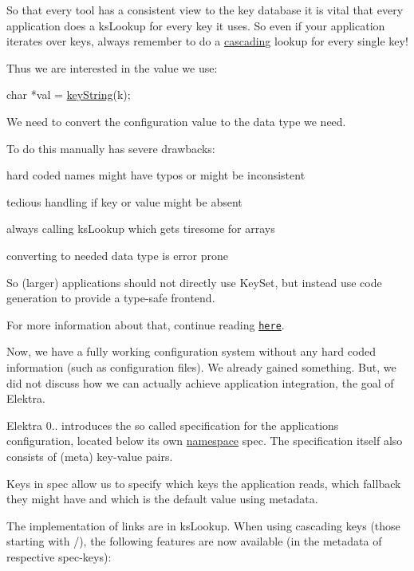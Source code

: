 So that every tool has a consistent view to the key database it is vital that every application does a {\ttfamily ks\+Lookup} for every key it uses. So even if your application iterates over keys, always remember to do a \hyperlink{doc_tutorials_cascading_md}{cascading} lookup for every single key!

Thus we are interested in the value we use\+:


\begin{DoxyCode}
\textcolor{keywordtype}{char} *val = \hyperlink{group__keyvalue_ga880936f2481d28e6e2acbe7486a21d05}{keyString}(k);
\end{DoxyCode}


We need to convert the configuration value to the data type we need.

To do this manually has severe drawbacks\+:


\begin{DoxyItemize}
\item hard coded names might have typos or might be inconsistent
\item tedious handling if key or value might be absent
\item always calling {\ttfamily ks\+Lookup} which gets tiresome for arrays
\item converting to needed data type is error prone
\end{DoxyItemize}

So (larger) applications should not directly use {\ttfamily Key\+Set}, but instead use code generation to provide a type-\/safe frontend.

For more information about that, continue reading \href{https://master.libelektra.org/src/tools/pythongen}{\tt here}.

Now, we have a fully working configuration system without any hard coded information (such as configuration files). We already gained something. But, we did not discuss how we can actually achieve application integration, the goal of Elektra.

Elektra 0.. introduces the so called specification for the application\textquotesingle{}s configuration, located below its own \hyperlink{doc_help_elektra-namespaces_md}{namespace} {\ttfamily spec}. The specification itself also consists of (meta) key-\/value pairs.

Keys in {\ttfamily spec} allow us to specify which keys the application reads, which fallback they might have and which is the default value using metadata.

The implementation of links are in {\ttfamily ks\+Lookup}. When using cascading keys (those starting with {\ttfamily /}), the following features are now available (in the metadata of respective {\ttfamily spec}-\/keys)\+:



